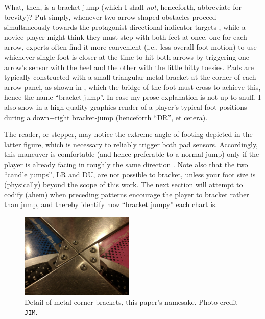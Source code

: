 \documentclass[10pt]{sigplanconf}
\begin{document}

What, then, is a bracket-jump (which I shall \textit{not}, henceforth, abbreviate for brevity)?
Put simply, whenever two arrow-shaped obstacles proceed simultaneously towards the protagonist directional indicator targets
\cite{turniness},
while a novice player might think they must step with both feet at once, one for each arrow,
experts often find it more convenient (i.e., less overall foot motion) to use whichever single foot is closer at the time
to hit both arrows by
triggering one arrow's sensor with the heel and the other with the little bitty toesies.
Pads are typically constructed with a small triangular metal bracket at the corner of each arrow panel,
as shown in ,
which the bridge of the foot must cross to achieve this, hence the name ``bracket jump''.
In case my prose explanation is not up to snuff, I also show in 
a high-quality graphics render of a player's typical foot positions during a down+right bracket-jump (henceforth ``DR'', et cetera).

The reader, or stepper,
may notice the extreme angle of footing depicted in the latter figure,
which is necessary to reliably trigger both pad sensors.
Accordingly, this maneuver is comfortable (and hence preferable to a normal jump)
only if the player is already facing in roughly the same direction \cite{turniness}.
Note also that the two ``candle jumps'', LR and DU, are not possible to bracket,
unless your foot size is (physically) beyond the scope of this work.
The next section will attempt to codify (ahem) when
preceding patterns encourage the player to bracket rather than jump,
and thereby identify how ``bracket jumpy'' each chart is.

\begin{figure}[t]
	\begin{center}
		\includegraphics[width=0.48\textwidth]{jims-pix.jpg}
	\end{center}
	\caption{Detail of metal corner brackets, this paper's namesake. Photo credit {\tt JIM}.}
	\label{fig:bracker-detail}
\end{figure}
\end{document}
